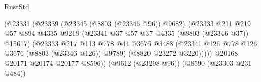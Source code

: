 \begin{lexlean}{RustStd}
\begin{coremodule}
                                                    (@23331
                                                      (@23339
                                                        (@23345 (@8803 (@23346 @96)) @9682)
                                                        (@23333
                                                          @211
                                                          @219
                                                          @57
                                                          @894
                                                          @4335
                                                          @9219
                                                          (@23341
                                                            @37
                                                            @57
                                                            @37
                                                            @4335
                                                            (@8803 (@23346 @37))
                                                            @15617)
                                                          (@23333
                                                            @217
                                                            @113
                                                            @778
                                                            @44
                                                            @3676
                                                            @3488
                                                            (@23341
                                                              @126
                                                              @778
                                                              @126
                                                              @3676
                                                              (@8803 (@23346 @126))
                                                              @9789)
                                                            (@8820 @23272 @3220)))))
                                                    @20168
                                                    @20171
                                                    @20174
                                                    @20177
                                                    @8596))
                                                (@9612 (@23298 @96))
                                                (@8590 (@23303 @231 @484))

\end{coremodule}
\end{lexlean}
